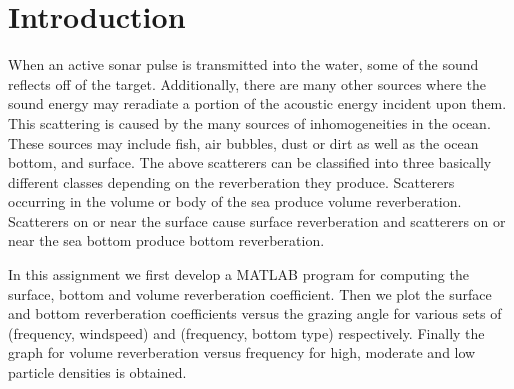  \chapter*{Introduction}



\noindent When an active sonar pulse is transmitted into the water, some of the sound reflects off of
the target. Additionally, there are many other sources where the sound energy may reradiate a portion of the acoustic energy incident upon them. This scattering is caused by the many sources of inhomogeneities in the ocean. These sources may include fish,  air bubbles, dust or dirt as well as the ocean bottom, and surface. The above scatterers can be classified into three basically different classes depending on the reverberation they produce. Scatterers occurring in the volume or body of the sea produce volume reverberation. Scatterers on or near the surface cause surface reverberation and scatterers on or near the sea bottom produce bottom reverberation. 

\noindent In this assignment we first develop a MATLAB program for computing the surface, bottom and volume reverberation coefficient. Then we plot the surface and bottom reverberation coefficients versus the grazing angle for various sets of (frequency, windspeed) and (frequency, bottom type) respectively. Finally the graph for volume reverberation versus frequency for high, moderate and low particle densities is obtained.





